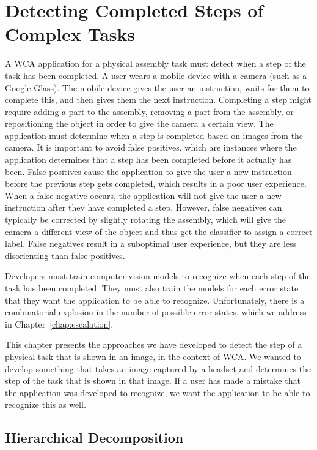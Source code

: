 \chapter{Detecting Completed Steps of Complex Tasks}\label{chap:detection}

A WCA application for a physical assembly task must detect when a step of the
task has been completed.
A user wears a mobile device with a camera (such as a Google Glass).
The mobile
device gives the user an instruction, waits for them to complete this, and then
gives them the next instruction.
Completing a step might require adding a part to the assembly,
removing a part from the assembly, or repositioning the object in order to give
the camera a certain view.
The application must determine when a step is completed
based on images from the camera.
It is important to avoid false positives, which are instances where the
application determines that a step has been completed before it actually has
been.
False positives cause the application to give the user a new instruction before
the previous step gets completed, which results in a poor user experience.
When a false negative occurs, the application will not give the user a new
instruction after they have completed a step.
However, false negatives can typically be corrected by slightly rotating the
assembly, which will give the camera a different view of the object and thus get
the classifier to assign a correct label.
False negatives result in a suboptimal user experience, but they
are less disorienting than false positives.

Developers must train computer vision models to recognize when each step of the
task has been completed.
They must also train the models for each error state that they want the
application to be able to recognize.
Unfortunately, there is a combinatorial explosion in the number of possible
error states, which we address in Chapter~\ref{chap:escalation}.

This chapter presents the approaches we have developed to detect the step of a
physical task that is shown in an image, in the context of WCA.
We wanted to develop something that takes an image captured by a headset and
determines the step of the task that is shown in that image.
If a user has made a mistake that the application was developed to recognize, we
want the application to be able to recognize this as well.

\section{Hierarchical Decomposition}

